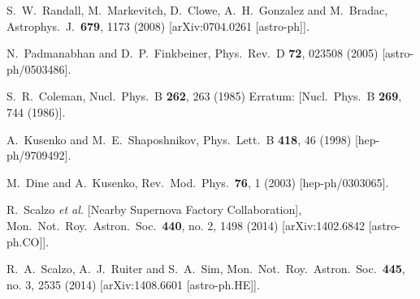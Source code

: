 \documentclass[twocolumn,preprintnumbers,amsmath,amssymb,prd, superscriptaddress]{revtex4} %
\begin{document}
\begin{thebibliography}{99}
  S.~W.~Randall, M.~Markevitch, D.~Clowe, A.~H.~Gonzalez and M.~Bradac,
  Astrophys.\ J.\  {\bf 679}, 1173 (2008)
  [arXiv:0704.0261 [astro-ph]].


  N.~Padmanabhan and D.~P.~Finkbeiner,
  Phys.\ Rev.\ D {\bf 72}, 023508 (2005)
  [astro-ph/0503486].


  S.~R.~Coleman,
  Nucl.\ Phys.\ B {\bf 262}, 263 (1985)
  Erratum: [Nucl.\ Phys.\ B {\bf 269}, 744 (1986)].


  A.~Kusenko and M.~E.~Shaposhnikov,
  Phys.\ Lett.\ B {\bf 418}, 46 (1998)
  [hep-ph/9709492].


  M.~Dine and A.~Kusenko,
  Rev.\ Mod.\ Phys.\  {\bf 76}, 1 (2003)
  [hep-ph/0303065].


  R.~Scalzo {\it et al.} [Nearby Supernova Factory Collaboration],
  Mon.\ Not.\ Roy.\ Astron.\ Soc.\  {\bf 440}, no. 2, 1498 (2014)
  [arXiv:1402.6842 [astro-ph.CO]].


  R.~A.~Scalzo, A.~J.~Ruiter and S.~A.~Sim,
  Mon.\ Not.\ Roy.\ Astron.\ Soc.\  {\bf 445}, no. 3, 2535 (2014)
  [arXiv:1408.6601 [astro-ph.HE]].



\end{thebibliography}
\end{document}

